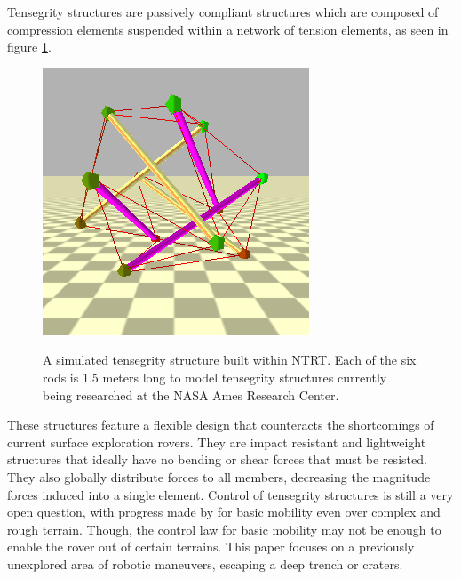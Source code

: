 \documentclass{llncs}
\begin{document}
Tensegrity structures are passively compliant structures which are composed of compression elements suspended within a network of tension elements, as seen in figure \ref{NTRT_sb_example}.
\begin{figure}
\centering
{\includegraphics[width=0.9\linewidth]{Pictures/6strut.png}} 
\caption{A simulated tensegrity structure built within NTRT. 
Each of the six rods is 1.5 meters long to model tensegrity structures currently being researched at the NASA Ames Research Center.}
\label{NTRT_sb_example}
\end{figure}
These structures feature a flexible design that counteracts the shortcomings of current surface exploration rovers.
They are impact resistant and lightweight structures that ideally have no bending or shear forces that must be resisted.
They also globally distribute forces to all members, decreasing the magnitude forces induced into a single element.
Control of tensegrity structures is still a very open question, with progress made by \cite{Iscen2013a, Tietz2013, mirletz2014design, Caluwaerts2013rsif, GraellsRovira2009, du2014dynamic} for basic mobility even over complex and rough terrain.
Though, the control law for basic mobility may not be enough to enable the rover out of certain terrains.
This paper focuses on a previously unexplored area of robotic maneuvers, escaping a deep trench or craters.
\end{document}
